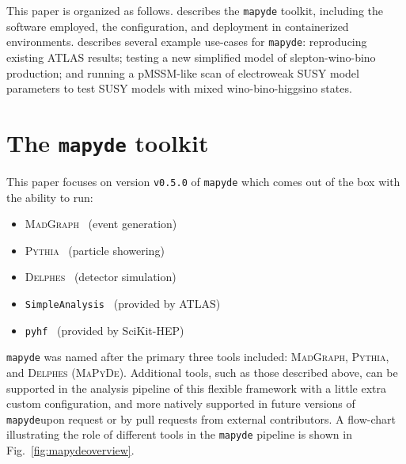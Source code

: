 \documentclass{article}
\newcommand{\mapyde}{\texttt{mapyde}}
\newcommand{\simpleanalysis}{\texttt{SimpleAnalysis}}
\newcommand{\madgraph}{\textsc{MadGraph}}
\newcommand{\pythia}{\textsc{Pythia}}
\newcommand{\delphes}{\textsc{Delphes}}
\newcommand{\pyhf}{\texttt{pyhf}}
\begin{document}
This paper is organized as follows.  describes the \mapyde{} toolkit, including the software employed, the configuration, and deployment in containerized environments.   describes several example use-cases for \mapyde: reproducing existing ATLAS results; testing a new simplified model of slepton-wino-bino production; and running a pMSSM-like scan of electroweak SUSY model parameters to test SUSY models with mixed wino-bino-higgsino states.

\section{The \mapyde{} toolkit}
\label{sec:the-toolkit}

This paper focuses on version \texttt{v0.5.0} of \mapyde{} which comes out of the box with the ability to run:

\begin{itemize}
	\item \madgraph~\cite{Alwall:2014hca,Frederix:2018nkq} (event generation)
	\item \pythia~\cite{Bierlich:2022pfr} (particle showering)
	\item \delphes~\cite{deFavereau:2013fsa,Selvaggi:2014mya,Mertens:2015kba} (detector simulation)
	\item \simpleanalysis~\cite{simpleanalysis,atlas_simpleanalysis} (provided by ATLAS)
	\item \pyhf~\cite{pyhf,pyhf_joss} (provided by SciKit-HEP)
\end{itemize}

\mapyde{} was named after the primary three tools included: \madgraph, \pythia, and \delphes{} (\textsc{MaPyDe}). Additional tools, such as those described above, can be supported in the analysis pipeline of this flexible framework with a little extra custom configuration, and more natively supported in future versions of \mapyde upon request or by pull requests from external contributors.  A flow-chart illustrating the role of different tools in the \mapyde{} pipeline is shown in Fig.~\ref{fig:mapydeoverview}.

\end{document}
